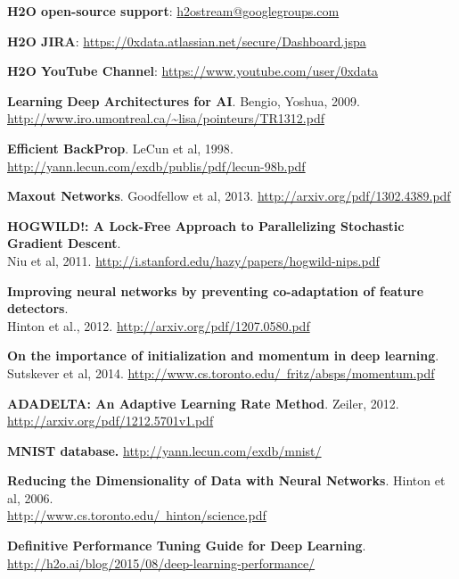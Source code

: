 \textbf{H2O open-source support}:   {\url{h2ostream@googlegroups.com}}

\textbf{H2O JIRA}: {\url{https://0xdata.atlassian.net/secure/Dashboard.jspa}}

\textbf{H2O YouTube Channel}: {\url{https://www.youtube.com/user/0xdata}}

\textbf{Learning Deep Architectures for AI}. Bengio, Yoshua, 2009. \\
 {\url{http://www.iro.umontreal.ca/~lisa/pointeurs/TR1312.pdf}}

\textbf{Efficient BackProp}.  {LeCun et al, 1998}. {\url{http://yann.lecun.com/exdb/publis/pdf/lecun-98b.pdf}}

\textbf{Maxout Networks}. {Goodfellow et al, 2013}.  {\url{http://arxiv.org/pdf/1302.4389.pdf}}

\textbf{HOGWILD!: A Lock-Free Approach to Parallelizing Stochastic Gradient Descent}.  \\
{Niu et al, 2011}.  {\url{http://i.stanford.edu/hazy/papers/hogwild-nips.pdf}}

\textbf{Improving neural networks by preventing co-adaptation of feature detectors}.  \\
{Hinton et al., 2012}.  \href{http://arxiv.org/pdf/1207.0580.pdf}{http://arxiv.org/pdf/1207.0580.pdf}

\textbf{On the importance of initialization and momentum in deep learning}.  {Sutskever et al, 2014}.  \href{http://www.cs.toronto.edu/~fritz/absps/momentum.pdf}{http://www.cs.toronto.edu/~fritz/absps/momentum.pdf}

\textbf{ADADELTA: An Adaptive Learning Rate Method}. {Zeiler, 2012}.  \\
 \href{http://arxiv.org/pdf/1212.5701v1.pdf}{http://arxiv.org/pdf/1212.5701v1.pdf}

\textbf{{MNIST database.}}  \href{http://yann.lecun.com/exdb/mnist/}{http://yann.lecun.com/exdb/mnist/}

\textbf{Reducing the Dimensionality of
Data with Neural Networks}.  {Hinton et al, 2006}. \\
 \href{http://www.cs.toronto.edu/~hinton/science.pdf}{http://www.cs.toronto.edu/~hinton/science.pdf}

\textbf{Definitive Performance Tuning Guide for Deep Learning}. \href{http://h2o.ai/blog/2015/08/deep-learning-performance/}{http://h2o.ai/blog/2015/08/deep-learning-performance/}






